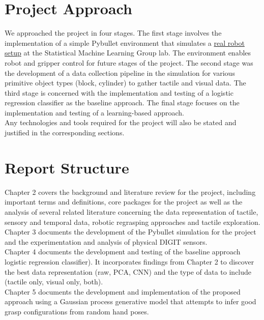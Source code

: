 \documentclass[12pt, a4paper]{report}
\theoremstyle{definition}
\begin{document}
\section{Project Approach}
\label{sec:1.3}
We approached the project in four stages. The first stage involves the implementation of a simple Pybullet environment that simulates a \hyperref[sec:]{real robot setup} at the Statistical Machine Learning Group lab. The environment enables robot and gripper control for future stages of the project. The second stage was the development of a data collection pipeline in the simulation for various primitive object types (block, cylinder) to gather tactile and visual data. The third stage is concerned with the implementation and testing of a logistic regression classifier as the baseline approach. The final stage focuses on the implementation and testing of a learning-based approach.\\

Any technologies and tools required for the project will also be stated and justified in the corresponding sections.


\section{Report Structure}
\label{sec:1.4}
Chapter 2 covers the background and literature review for the project, including important terms and definitions, core packages for the project as well as the analysis of several related literature concerning the data representation of tactile, sensory and temporal data, robotic regrasping approaches and tactile exploration.\\

Chapter 3 documents the development of the Pybullet simulation for the project and the experimentation and analysis of physical DIGIT sensors.\\

Chapter 4 documents the development and testing of the baseline approach logistic regression classifier). It incorporates findings from Chapter 2 to discover the best data representation (raw, PCA, CNN) and the type of data to include (tactile only, visual only, both).\\

Chapter 5 documents the development and implementation of the proposed approach using a Gaussian process generative model that attempts to infer good grasp configurations from random hand poses.\\
\end{document}

